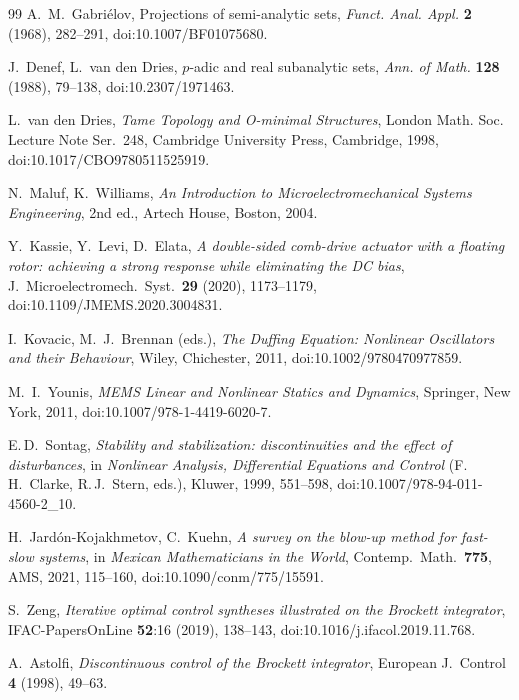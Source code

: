 \documentclass[11pt,reqno]{amsart}
\theoremstyle{plain}
\theoremstyle{definition}
\theoremstyle{remark}
\begin{document}
\begin{thebibliography}{99}
 A.~M.~Gabri\'elov, Projections of semi-analytic sets, \emph{Funct. Anal. Appl.} \textbf{2} (1968), 282--291, doi:10.1007/BF01075680.

 J.~Denef, L.~van den Dries, $p$-adic and real subanalytic sets, \emph{Ann. of Math.} \textbf{128} (1988), 79--138, doi:10.2307/1971463.

 L.~van den Dries, \emph{Tame Topology and O-minimal Structures}, London Math. Soc. Lecture Note Ser.~248, Cambridge University Press, Cambridge, 1998, doi:10.1017/CBO9780511525919.

 N.~Maluf, K.~Williams,
  \emph{An Introduction to Microelectromechanical Systems Engineering}, 2nd ed., Artech House, Boston, 2004.

 Y.~Kassie, Y.~Levi, D.~Elata,
  \emph{A double-sided comb-drive actuator with a floating rotor: achieving a strong response while eliminating the
  DC bias}, J.\ Microelectromech.\ Syst.\ \textbf{29} (2020), 1173--1179, doi:10.1109/JMEMS.2020.3004831.

 I.~Kovacic, M.~J.~Brennan (eds.), \emph{The Duffing Equation: Nonlinear Oscillators and their Behaviour}, Wiley, Chichester, 2011, doi:10.1002/9780470977859.

 M.~I.~Younis, \emph{MEMS Linear and Nonlinear Statics and Dynamics}, Springer, New York, 2011, doi:10.1007/978-1-4419-6020-7.

 E.\,D.~Sontag,
  \emph{Stability and stabilization: discontinuities and the effect of disturbances}, in \emph{Nonlinear Analysis,
  Differential Equations and Control} (F.\,H.~Clarke, R.\,J.~Stern, eds.), Kluwer, 1999, 551--598,
  doi:10.1007/978-94-011-4560-2\_10.

 H.~Jard\'on-Kojakhmetov, C.~Kuehn,
  \emph{A survey on the blow-up method for fast-slow systems}, in \emph{Mexican Mathematicians in the World},
  Contemp.\ Math.\ \textbf{775}, AMS, 2021, 115--160, doi:10.1090/conm/775/15591.

 S.~Zeng,
  \emph{Iterative optimal control syntheses illustrated on the Brockett integrator},
  IFAC-PapersOnLine \textbf{52}:16 (2019), 138--143, doi:10.1016/j.ifacol.2019.11.768.

 A.~Astolfi,
  \emph{Discontinuous control of the Brockett integrator},
  European J.\ Control \textbf{4} (1998), 49--63.


\end{thebibliography}
\end{document}
